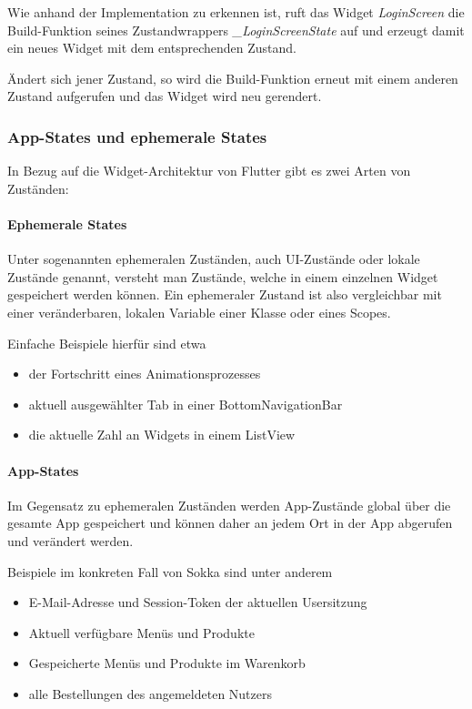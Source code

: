 Wie anhand der Implementation zu erkennen ist, ruft das Widget \textit{LoginScreen} die Build-Funktion
seines Zustandwrappers \textit{\_LoginScreenState} auf und erzeugt damit ein neues Widget mit dem entsprechenden
Zustand.

Ändert sich jener Zustand, so wird die Build-Funktion erneut mit einem anderen Zustand aufgerufen und das Widget wird neu gerendert.

\subsubsection{App-States und ephemerale States}


In Bezug auf die Widget-Architektur von Flutter gibt es zwei Arten von Zuständen:

\paragraph{Ephemerale States}

Unter sogenannten ephemeralen Zuständen, auch UI-Zustände oder lokale Zustände genannt, versteht man Zustände, welche in
einem einzelnen Widget gespeichert werden können. Ein ephemeraler Zustand ist also vergleichbar mit einer veränderbaren, lokalen Variable einer Klasse oder eines Scopes.

\newpage

Einfache Beispiele hierfür sind etwa
\begin{itemize}
    \item der Fortschritt eines Animationsprozesses
    \item aktuell ausgewählter Tab in einer BottomNavigationBar
    \item die aktuelle Zahl an Widgets in einem ListView
\end{itemize}

\paragraph{App-States}

Im Gegensatz zu ephemeralen Zuständen werden App-Zustände global über die gesamte App gespeichert und können daher an jedem Ort in der App abgerufen und verändert werden.

Beispiele im konkreten Fall von Sokka sind unter anderem
\begin{itemize}
    \item E-Mail-Adresse und Session-Token der aktuellen Usersitzung
    \item Aktuell verfügbare Menüs und Produkte
    \item Gespeicherte Menüs und Produkte im Warenkorb
    \item alle Bestellungen des angemeldeten Nutzers
\end{itemize}

